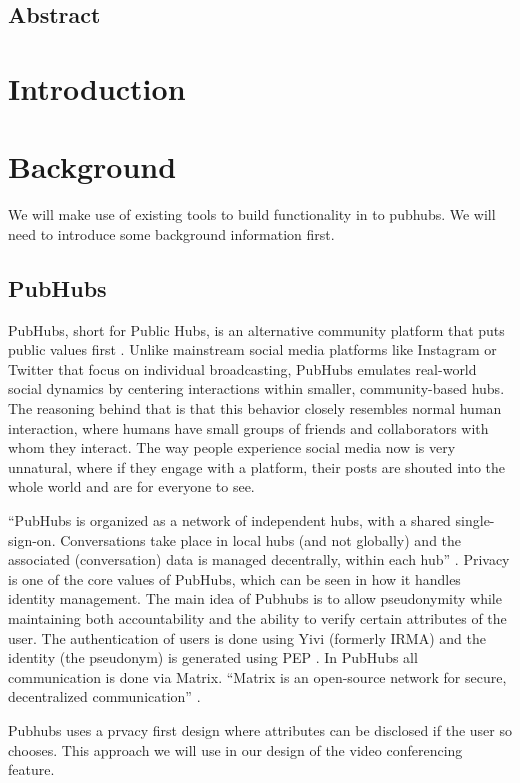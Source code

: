 \documentclass{report}
\begin{document}
\newpage
\section*{Abstract}

\chapter{Introduction}


\chapter{Background}
We will make use of existing tools to build functionality in to pubhubs. We will need to introduce some background information first. 

\section{PubHubs}
PubHubs, short for Public Hubs, is an alternative community platform that puts public values first \cite{jacobs_pubhubs_2023}. Unlike mainstream social media platforms like Instagram or Twitter that focus on individual broadcasting, PubHubs emulates real-world social dynamics by centering interactions within smaller, community-based hubs. The reasoning behind that is that this behavior closely resembles normal human interaction, where humans have small groups of friends and collaborators with whom they interact. The way people experience social media now is very unnatural, where if they engage with a platform, their posts are shouted into the whole world and are for everyone to see.

“PubHubs is organized as a network of independent hubs, with a shared single-sign-on. Conversations take place in local hubs (and not globally) and the associated (conversation) data is managed decentrally, within each hub” \cite{jacobs_pubhubs_2023}. Privacy is one of the core values of PubHubs, which can be seen in how it handles identity management. The main idea of Pubhubs is to allow pseudonymity while maintaining both accountability and the ability to verify certain attributes of the user. The authentication of users is done using Yivi (formerly IRMA)\cite{alpar_irma_nodate} and the identity (the pseudonym) is generated using PEP \cite{verheul_polymorphic_2016}. In PubHubs all communication is done via Matrix. “Matrix is an open-source network for secure, decentralized communication” \cite{noauthor_matrixorg_nodate}.

Pubhubs uses a prvacy first design where attributes can be disclosed if the user so chooses. This approach we will use in our design of the video conferencing feature.
\end{document}
